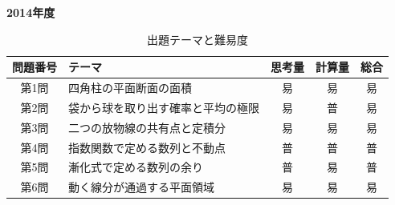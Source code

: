 \documentclass[../../main.tex]{subfiles}
\begin{document}
\begin{center}
  {\fontsize{48pt}{58pt}\selectfont \textbf{2014}\normalsize\textbf{年度}}
\end{center}

\begin{table}[htb]
  \centering
  \caption{出題テーマと難易度}
  \begin{tabular}{|c|p{6.2cm}|c|c|c|}
    \hline
    \textbf{問題番号} & \textbf{テーマ} & \textbf{思考量} & \textbf{計算量} & \textbf{総合} \\
    \hline
    第1問 & 四角柱の平面断面の面積 & 易 & 易 & 易 \\
    \hline
    第2問 & 袋から球を取り出す確率と平均の極限 & 易 & 普 & 易 \\
    \hline
    第3問 & 二つの放物線の共有点と定積分 & 易 & 易 & 易 \\
    \hline
    第4問 & 指数関数で定める数列と不動点 & 普 & 普 & 普 \\
    \hline
    第5問 & 漸化式で定める数列の余り & 普 & 易 & 普 \\
    \hline
    第6問 & 動く線分が通過する平面領域 & 易 & 易 & 易 \\
    \hline
  \end{tabular}
\end{table}
\end{document}
